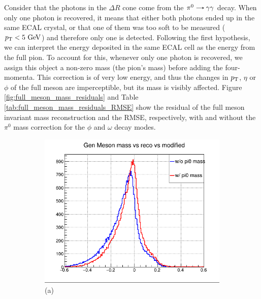 \begin{myitemlist}
    Consider that the photons in the $\Delta R$ cone come from the $\pi^{0}\decaysto\gamma\gamma$ decay. When only one photon is recovered, it means that either both photons ended up in the same ECAL crystal, or that one of them was too soft to be measured ($p_\text{T} < 5\ \text{GeV}$) and therefore only one is detected. Following the first hypothesis, we can interpret the energy deposited in the same ECAL cell as the energy from the full pion. To account for this, whenever only one photon is recovered, we assign this object a non-zero mass (the pion's mass) before adding the four-momenta. This correction is of very low energy, and thus the changes in $p_\text{T}$, $\eta$ or $\phi$ of the full meson are imperceptible, but its mass is visibly affected. Figure \ref{fig:full_meson_mass_residuals} and Table \ref{tab:full_meson_mass_residuals_RMSE} show the residual of the full meson invariant mass reconstruction and the RMSE, respectively, with and without the $\pi^0$ mass correction for the $\phi$ and $\omega$ decay modes.
    \begin{figure}[!ht]
        \captionsetup[subfigure]{labelformat=empty}
        \vspace*{-0.2cm}
        \centering
        \setlength{\mylength}{\textwidth}
        \begin{subfigure}[t]{0.50\mylength}
                \centering
                \includegraphics[width=0.45\mylength]{resources/plots/Phi3_fullmeson_mass_residual.png}
                \caption{\footnotesize (a)}
        \end{subfigure}%
        \begin{subfigure}[t]{0.50\mylength}

\end{subfigure}
\end{figure}
\end{myitemlist}
